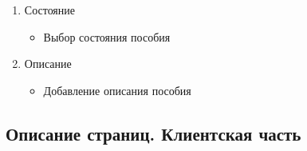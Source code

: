 \begin{enumerate}
\begin{enumerate}
\begin{enumerate}
			\item Состояние
			\begin{itemize}
				\item Выбор состояния пособия
			\end{itemize}

			\item Описание
			\begin{itemize}
				\item Добавление описания пособия
			\end{itemize}

		\end{enumerate}
	\end{enumerate}
\end{enumerate}


\subsection{Описание страниц. Клиентская часть}


